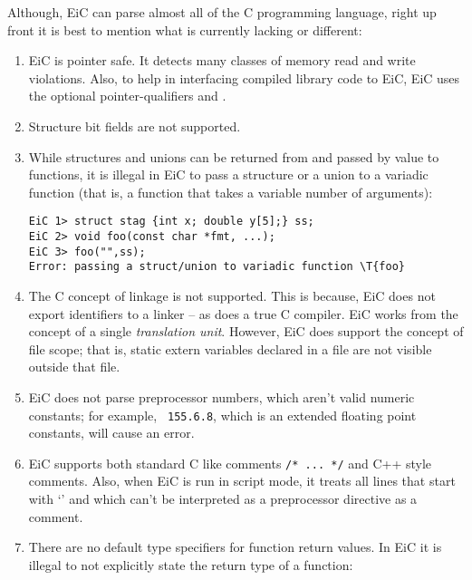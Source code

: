 \documentclass[12pt]{report}
\begin{document}
Although, EiC can parse almost all of the  C programming
language, right up front it is
best to mention what is currently lacking or different:
\begin{enumerate}

\item EiC is pointer safe. It detects many classes of memory read and
write violations. Also, to help in interfacing compiled library code
to EiC, EiC uses the optional pointer-qualifiers  and .

\item Structure  bit fields 
 are not supported.

\item  While structures and unions can be returned from and passed by value to
functions, it is illegal in EiC to pass a structure
or a union to a variadic function (that is, a function that
takes a variable number of arguments):
        \begin{production}
        \begin{verbatim}
EiC 1> struct stag {int x; double y[5];} ss; 
EiC 2> void foo(const char *fmt, ...);  
EiC 3> foo("",ss);
Error: passing a struct/union to variadic function \T{foo}
        \end{verbatim}
        \end{production}

\item The C concept of linkage is not supported.
        This is because, EiC does not export identifiers to a linker --
        as does a true C compiler. EiC works from the concept of a
        single {\it translation unit}. However, EiC does support the concept
	of file scope; that is, static extern variables declared in a file
	are not visible outside that file. 


\item EiC does not parse preprocessor numbers, 
        which aren't valid numeric constants; for example, {\tt
155.6.8}, which is an extended floating point constants, will cause an
error.
 
\item EiC supports both standard C like comments \verb+/* ... */+
        and C++ style comments. Also, when
	EiC is run in script mode, it
	treats all lines that start with `\T{\#}' and which can't be
	interpreted as a preprocessor directive as a comment.

\item  There are no default type specifiers for function return values. In EiC it is 
        illegal to not explicitly state the return type of a function:


\end{enumerate}
\end{document}
